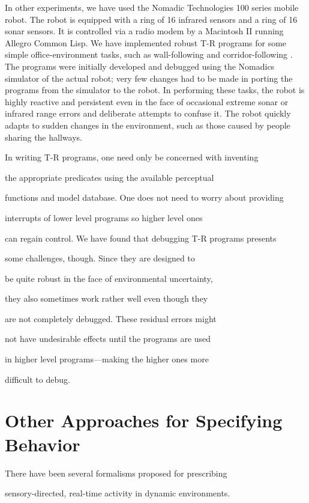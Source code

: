 In other experiments, we have used the  Nomadic Technologies 100 series  
mobile robot.  The robot is equipped with a ring of 16 infrared sensors  and  
a ring of 16 sonar sensors.  It is controlled via a radio modem by a  
Macintosh II running Allegro Common Lisp.   We have implemented robust T-R  
programs for some simple office-environment tasks, such as wall-following and  
corridor-following \cite{Galles}.  The programs were initially developed and  
debugged using the Nomadics simulator of the actual robot; very few changes  
had to be made in porting the programs from the simulator to the robot.  In  
performing these tasks, the robot is highly reactive and persistent even in  
the face of occasional extreme sonar or infrared range errors and deliberate  
attempts to confuse it. The robot quickly adapts to sudden changes in the  
environment, such as those caused by people sharing the hallways. 



In writing T-R programs, one need only be concerned with inventing 

the appropriate predicates using the available perceptual 

functions and model database.    One does not need to worry about providing 

interrupts of lower level programs so higher level ones 

can regain control.  We have found that debugging T-R programs presents 

some challenges, though.  Since they are designed to 

be quite robust in the face of environmental uncertainty, 

they also sometimes work rather well even though they 

are not completely debugged.  These residual errors might 

not have undesirable effects until the programs are used 

in higher level programs---making the higher ones more 

difficult to debug.


\section{Other Approaches for Specifying Behavior}

There have been several formalisms proposed for prescribing 

sensory-directed, real-time activity in dynamic environments. 

